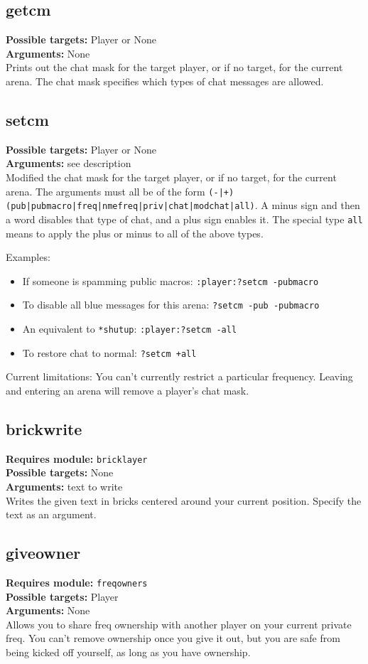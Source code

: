 \documentclass{article}
\newcommand{\requiremod}[1]{\noindent\textbf{Requires module:} \texttt{#1}\\}
\newcommand{\targets}[1]{\noindent\textbf{Possible targets:} #1\\}
\newcommand{\args}[1]{\noindent\textbf{Arguments:} #1\\}
\begin{document}
\subsection{getcm}
\targets{Player or None}
\args{None}
Prints out the chat mask for the target player, or if no target, for the
current arena. The chat mask specifies which types of chat messages are
allowed.

\subsection{setcm}
\targets{Player or None}
\args{see description}
Modified the chat mask for the target player, or if no target, for the
current arena. The arguments must all be of the form
\texttt{(-|+)(pub|pubmacro|freq|nmefreq|priv|chat|modchat|all)}. A minus
sign and then a word disables that type of chat, and a plus sign enables
it. The special type \texttt{all} means to apply the plus or minus to
all of the above types.

Examples:
\begin{itemize}
\item If someone is spamming public macros: \verb/:player:?setcm -pubmacro/
\item To disable all blue messages for this arena: \verb/?setcm -pub -pubmacro/
\item An equivalent to \verb/*shutup/: \verb/:player:?setcm -all/
\item To restore chat to normal: \verb/?setcm +all/
\end{itemize}

Current limitations: You can't currently restrict a particular
frequency. Leaving and entering an arena will remove a player's chat
mask.


\subsection{brickwrite}  %
\requiremod{bricklayer}
\targets{None}
\args{text to write}
Writes the given text in bricks centered around your current position.
Specify the text as an argument.

\subsection{giveowner}  %
\requiremod{freqowners}
\targets{Player}
\args{None}
Allows you to share freq ownership with another player on your current
private freq. You can't remove ownership once you give it out, but you
are safe from being kicked off yourself, as long as you have ownership.
\end{document}
